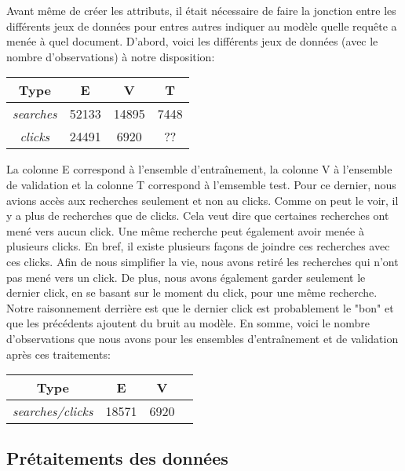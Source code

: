 
Avant même de créer les attributs, il était nécessaire de faire la jonction entre les différents jeux de données pour entres autres indiquer au modèle quelle requête a menée à quel document. D'abord, voici les différents jeux de données (avec le nombre d'observations) à notre disposition:

\begin{center}
  \begin{tabular}{ |c|c|c|c| } 
     \hline
     Type & E & V & T \\
     \hline
     \hline
     \textit{searches} & 52133 & 14895 & 7448 \\ 
     \hline
     \textit{clicks} & 24491 & 6920 & ?? \\ 
     \hline
  \end{tabular}
\end{center}

La colonne E correspond à l'ensemble d'entraînement, la colonne V à l'ensemble de validation et la colonne T correspond à l'emsemble test. Pour ce dernier, nous avions accès aux recherches seulement et non au clicks. Comme on peut le voir, il y a plus de recherches que de clicks. Cela veut dire que certaines recherches ont mené vers aucun click. Une même recherche peut également avoir menée à plusieurs clicks. En bref, il existe plusieurs façons de joindre ces recherches avec ces clicks. Afin de nous simplifier la vie, nous avons retiré les recherches qui n'ont pas mené vers un click. De plus, nous avons également garder seulement le dernier click, en se basant sur le moment du click, pour une même recherche. Notre raisonnement derrière est que le dernier click est probablement le "bon" et que les précédents ajoutent du bruit au modèle. En somme, voici le nombre d'observations que nous avons pour les ensembles d'entraînement et de validation après ces traitements:

\begin{center}
  \begin{tabular}{ |c|c|c|c| } 
     \hline
     Type & E & V \\
     \hline
     \hline
     \textit{searches/clicks} & 18571 & 6920 \\ 
     \hline
  \end{tabular}
\end{center}

\subsection{Prétaitements des données}

